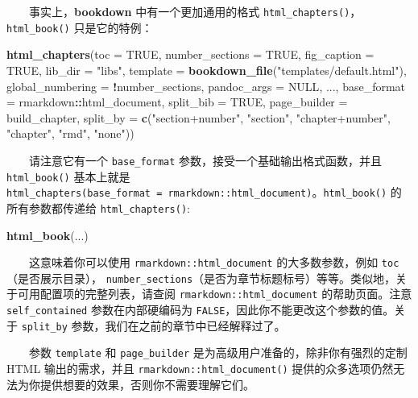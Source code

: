 \documentclass[
  12pt,
]{krantz}
\newenvironment{Shaded}{\begin{snugshade}}{\end{snugshade}}
\newcommand{\AttributeTok}[1]{\textcolor[rgb]{0.13,0.29,0.53}{#1}}
\newcommand{\ConstantTok}[1]{\textcolor[rgb]{0.56,0.35,0.01}{#1}}
\newcommand{\FunctionTok}[1]{\textcolor[rgb]{0.13,0.29,0.53}{\textbf{#1}}}
\newcommand{\NormalTok}[1]{#1}
\newcommand{\SpecialCharTok}[1]{\textcolor[rgb]{0.81,0.36,0.00}{\textbf{#1}}}
\newcommand{\StringTok}[1]{\textcolor[rgb]{0.31,0.60,0.02}{#1}}
\theoremstyle{definition}
\theoremstyle{definition}
\theoremstyle{definition}
\theoremstyle{definition}
\theoremstyle{remark}
\begin{document}
  事实上，\textbf{bookdown} 中有一个更加通用的格式 \texttt{html\_chapters()}，\texttt{html\_book()} 只是它的特例：

\begin{Shaded}
\begin{Highlighting}[]
\FunctionTok{html\_chapters}\NormalTok{(}\AttributeTok{toc =} \ConstantTok{TRUE}\NormalTok{, }\AttributeTok{number\_sections =} \ConstantTok{TRUE}\NormalTok{,}
  \AttributeTok{fig\_caption =} \ConstantTok{TRUE}\NormalTok{, }\AttributeTok{lib\_dir =} \StringTok{"libs"}\NormalTok{,}
  \AttributeTok{template =} \FunctionTok{bookdown\_file}\NormalTok{(}\StringTok{"templates/default.html"}\NormalTok{),}
  \AttributeTok{global\_numbering =} \SpecialCharTok{!}\NormalTok{number\_sections,}
  \AttributeTok{pandoc\_args =} \ConstantTok{NULL}\NormalTok{, ...,}
  \AttributeTok{base\_format =}\NormalTok{ rmarkdown}\SpecialCharTok{::}\NormalTok{html\_document,}
  \AttributeTok{split\_bib =} \ConstantTok{TRUE}\NormalTok{, }\AttributeTok{page\_builder =}\NormalTok{ build\_chapter,}
  \AttributeTok{split\_by =} \FunctionTok{c}\NormalTok{(}\StringTok{"section+number"}\NormalTok{, }\StringTok{"section"}\NormalTok{, }\StringTok{"chapter+number"}\NormalTok{, }\StringTok{"chapter"}\NormalTok{, }\StringTok{"rmd"}\NormalTok{, }\StringTok{"none"}\NormalTok{))}
\end{Highlighting}
\end{Shaded}

  请注意它有一个 \texttt{base\_format} 参数，接受一个基础输出格式函数，并且 \texttt{html\_book()} 基本上就是 \texttt{html\_chapters(base\_format\ =\ rmarkdown::html\_document)}。\texttt{html\_book()} 的所有参数都传递给 \texttt{html\_chapters()}:

\begin{Shaded}
\begin{Highlighting}[]
\FunctionTok{html\_book}\NormalTok{(...)}
\end{Highlighting}
\end{Shaded}

  这意味着你可以使用 \texttt{rmarkdown::html\_document} 的大多数参数，例如 \texttt{toc} （是否展示目录）， \texttt{number\_sections}（是否为章节标题标号）等等。类似地，关于可用配置项的完整列表，请查阅 \texttt{rmarkdown::html\_document} 的帮助页面。注意 \texttt{self\_contained} 参数在内部硬编码为 \texttt{FALSE}，因此你不能更改这个参数的值。关于 \texttt{split\_by} 参数，我们在之前的章节中已经解释过了。

  参数 \texttt{template} 和 \texttt{page\_builder} 是为高级用户准备的，除非你有强烈的定制 HTML 输出的需求，并且 \texttt{rmarkdown::html\_document()} 提供的众多选项仍然无法为你提供想要的效果，否则你不需要理解它们。
\end{document}
